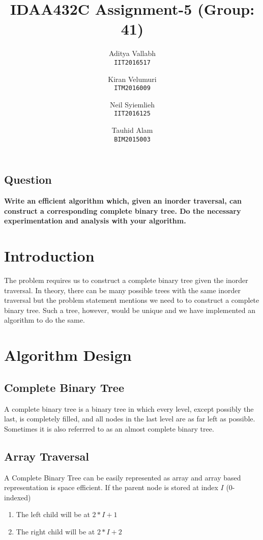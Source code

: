 \documentclass[letterpaper, 12 pt, conference]{ieeeconf}  %
\title{\LARGE 
IDAA432C Assignment-5 (Group: 41)
}
\author{
  Aditya Vallabh\\
  \texttt{IIT2016517}
  \and
  Kiran Velumuri\\
  \texttt{ITM2016009}
  \and
  Neil Syiemlieh\\
  \texttt{IIT2016125}
  \and
  Tauhid Alam\\
  \texttt{BIM2015003}
}
\begin{document}
\maketitle
\thispagestyle{empty}
\pagestyle{empty}



\subsection*{ \textbf{Question} }
\textbf{Write an efficient algorithm which, given an inorder traversal, can construct a corresponding complete binary tree. Do the necessary experimentation and analysis with your algorithm. }


\section{Introduction}
The problem requires us to construct a complete binary tree given the inorder traversal. In theory, there can be many possible trees with the same inorder traversal but the problem statement mentions we need to to construct a complete binary tree. Such a tree, however, would be unique and we have implemented an algorithm to do the same.

\section{Algorithm Design}
\subsection{Complete Binary Tree}
A complete binary tree is a binary tree in which every level,  except possibly the last, is completely filled, and all nodes in the last level are as far left as possible. Sometimes it is also referrred to as an almost complete binary tree.


\subsection{Array Traversal}
A Complete Binary Tree can be easily represented as array and array based representation is space efficient. If the parent node is stored at index $I$ (0-indexed)
\begin{enumerate}
\item The left child will be at $2 * I + 1$
\item The right child will be at $2 * I + 2$
\end{enumerate}
\end{document}
